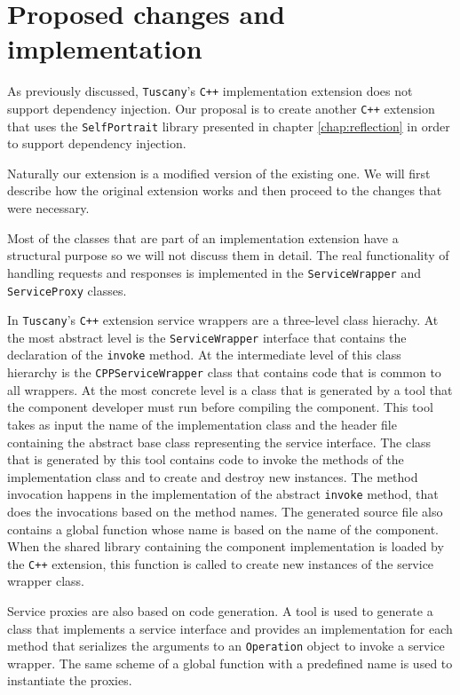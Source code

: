 \section{Proposed changes and implementation}

As previously discussed, \texttt{Tuscany}'s \texttt{C++} implementation extension does not support dependency injection. Our proposal is to
create another \texttt{C++} extension that uses the \texttt{SelfPortrait} library presented in chapter \ref{chap:reflection} in order
to support dependency injection. 

Naturally our extension is a modified version of the existing one. We will first describe how the original extension works
and then proceed to the changes that were necessary.
 
Most of the classes that are part of an implementation extension have a structural purpose so we will not discuss them in
detail. The real functionality of handling requests and responses is implemented in the \texttt{ServiceWrapper} and 
\texttt{ServiceProxy} classes. 

In \texttt{Tuscany}'s \texttt{C++} extension service wrappers are a three-level class hierachy. At the most abstract level is the
\texttt{ServiceWrapper} interface that contains the declaration of the \texttt{invoke} method. At the intermediate level of
this class hierarchy is the \texttt{CPPServiceWrapper} class that contains code that is common to all wrappers.
At the most concrete level is a class that is generated by a tool that the component developer must run before
compiling the component. This tool takes as input the name of the implementation class and the header file containing
the abstract base class representing the service interface. The class that is generated by this tool contains code
to invoke the methods of the implementation class and to create and destroy new instances. The method invocation
happens in the implementation of the abstract \texttt{invoke} method, that does the invocations based on the method names.
The generated source file also contains a global function whose name is based on the name of the component. When
the shared library containing the component implementation is loaded by the \texttt{C++} extension, this function is called
to create new instances of the service wrapper class.

Service proxies are also based on code generation. A tool is used to generate a class that implements a service interface
and provides an implementation for each method that serializes the arguments to an \texttt{Operation} object to invoke a service
wrapper. The same scheme of a global function with a predefined name is used to instantiate the proxies.

